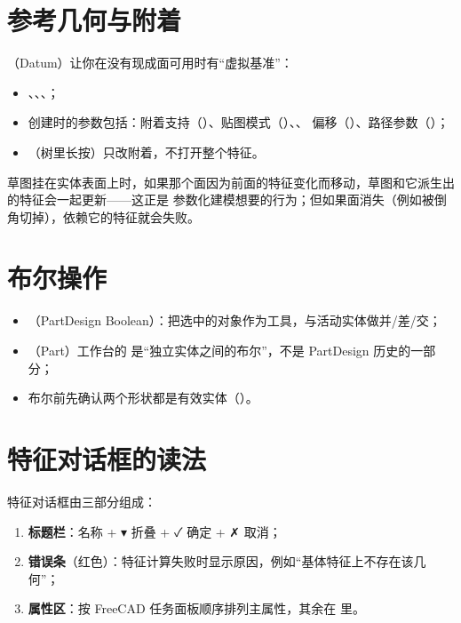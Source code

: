 \section{参考几何与附着}

（Datum）让你在没有现成面可用时有“虚拟基准”：

\begin{itemize}
  \item {}、、、；
  \item 创建时的参数包括：附着支持（）、贴图模式（）、、
        偏移（）、路径参数（）；
  \item {}（树里长按）只改附着，不打开整个特征。
\end{itemize}

\begin{warn}
草图挂在实体表面上时，如果那个面因为前面的特征变化而移动，草图和它派生出的特征会一起更新——这正是
参数化建模想要的行为；但如果面消失（例如被倒角切掉），依赖它的特征就会失败。
\end{warn}

\section{布尔操作}

\begin{itemize}
  \item {}（PartDesign Boolean）：把选中的对象作为工具，与活动实体做并/差/交；
  \item {}（Part）工作台的  是“独立实体之间的布尔”，不是 PartDesign 历史的一部分；
  \item 布尔前先确认两个形状都是有效实体（）。
\end{itemize}

\section{特征对话框的读法}

特征对话框由三部分组成：

\begin{enumerate}
  \item \textbf{标题栏}：名称 + ▾ 折叠 + ✓ 确定 + ✗ 取消；
  \item \textbf{错误条}（红色）：特征计算失败时显示原因，例如“基体特征上不存在该几何”；
  \item \textbf{属性区}：按 FreeCAD 任务面板顺序排列主属性，其余在  里。
\end{enumerate}

